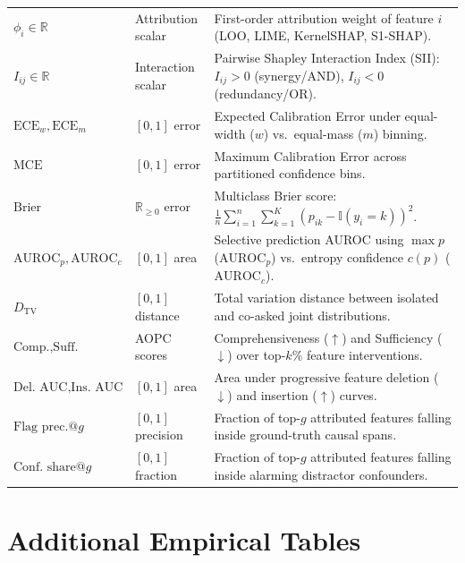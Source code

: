 \documentclass[10pt]{article}
\begin{document}
\begin{table}[!htbp]
{\begin{tabular}{llp{9.0cm}}
$\phi_i \in \mathbb{R}$ & Attribution scalar & First-order attribution weight of feature $i$ (LOO, LIME, KernelSHAP, S1-SHAP). \\
$I_{ij} \in \mathbb{R}$ & Interaction scalar & Pairwise Shapley Interaction Index (SII): $I_{ij} > 0$ (synergy/AND), $I_{ij} < 0$ (redundancy/OR). \\
\midrule
$\text{ECE}_w, \text{ECE}_m$ & $[0, 1]$ error & Expected Calibration Error under equal-width ($w$) vs.\ equal-mass ($m$) binning. \\
$\text{MCE}$ & $[0, 1]$ error & Maximum Calibration Error across partitioned confidence bins. \\
$\text{Brier}$ & $\mathbb{R}_{\ge 0}$ error & Multiclass Brier score: $\frac{1}{n} \sum_{i=1}^n \sum_{k=1}^K (p_{ik} - \mathbb{I}(y_i = k))^2$. \\
$\text{AUROC}_p, \text{AUROC}_c$ & $[0, 1]$ area & Selective prediction AUROC using $\max p$ ($\text{AUROC}_p$) vs.\ entropy confidence $c(p)$ ($\text{AUROC}_c$). \\
$D_{\text{TV}}$ & $[0, 1]$ distance & Total variation distance between isolated and co-asked joint distributions. \\
$\text{Comp.}, \text{Suff.}$ & AOPC scores & Comprehensiveness ($\uparrow$) and Sufficiency ($\downarrow$) over top-$k\%$ feature interventions. \\
$\text{Del.\ AUC}, \text{Ins.\ AUC}$ & $[0, 1]$ area & Area under progressive feature deletion ($\downarrow$) and insertion ($\uparrow$) curves. \\
$\text{Flag prec.@}g$ & $[0, 1]$ precision & Fraction of top-$g$ attributed features falling inside ground-truth causal spans. \\
$\text{Conf.\ share@}g$ & $[0, 1]$ fraction & Fraction of top-$g$ attributed features falling inside alarming distractor confounders. \\
\bottomrule
\end{tabular}%
}
\end{table}

\clearpage
\section{Additional Empirical Tables}

\begin{table}[!htbp]
\centering
\caption{Change in ECE (equal-width bins), accuracy, and flip rate relative to clean inputs, with paired bootstrap $95\%$ intervals.}
\label{tab:perturbed}
\resizebox{\textwidth}{!}{}
\end{table}
\end{document}
